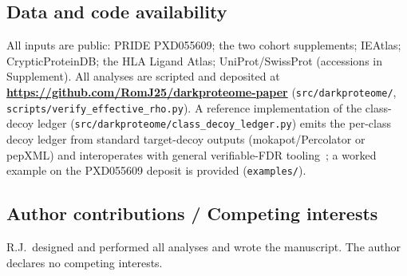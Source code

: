 \subsection*{Data and code availability}
All inputs are public: PRIDE PXD055609; the two cohort supplements; IEAtlas; CrypticProteinDB; the HLA Ligand Atlas; UniProt/SwissProt (accessions in Supplement). All analyses are scripted and deposited at \mbox{\textbf{\url{https://github.com/RomJ25/darkproteome-paper}}} (\texttt{src/darkproteome/}, \texttt{scripts/verify\_effective\_rho.py}). A reference implementation of the class-decoy ledger (\texttt{src/darkproteome/class\_decoy\_ledger.py}) emits the per-class decoy ledger from standard target-decoy outputs (mokapot/Percolator or pepXML) and interoperates with general verifiable-FDR tooling~\cite{r21}; a worked example on the PXD055609 deposit is provided (\texttt{examples/}).

\subsection*{Author contributions / Competing interests}
R.J.\ designed and performed all analyses and wrote the manuscript. The author declares no competing interests.

